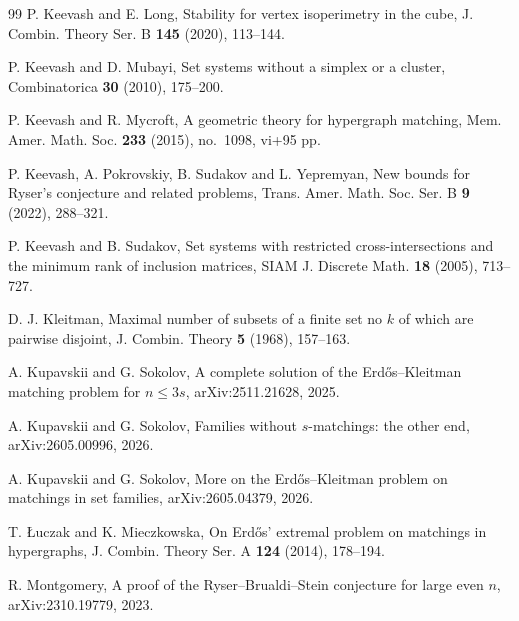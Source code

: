 \documentclass[10pt,a4paper]{article}
\numberwithin{equation}{section}
\theoremstyle{definition}
\begin{document}
\begin{thebibliography}{99}
        P. Keevash and E. Long,
        Stability for vertex isoperimetry in the cube,
        J. Combin. Theory Ser. B \textbf{145} (2020), 113--144.

        P. Keevash and D. Mubayi,
        Set systems without a simplex or a cluster,
        Combinatorica \textbf{30} (2010), 175--200.

        P. Keevash and R. Mycroft,
        A geometric theory for hypergraph matching,
        Mem. Amer. Math. Soc. \textbf{233} (2015), no.~1098, vi+95 pp.

        P. Keevash, A. Pokrovskiy, B. Sudakov and L. Yepremyan,
        New bounds for Ryser's conjecture and related problems,
        Trans. Amer. Math. Soc. Ser. B \textbf{9} (2022), 288--321.

        P. Keevash and B. Sudakov,
        Set systems with restricted cross-intersections and the minimum rank of inclusion matrices,
        SIAM J. Discrete Math. \textbf{18} (2005), 713--727.

        D. J. Kleitman,
        Maximal number of subsets of a finite set no $k$ of which are pairwise disjoint,
        J. Combin. Theory \textbf{5} (1968), 157--163.

        A. Kupavskii and G. Sokolov,
        A complete solution of the Erd\H{o}s--Kleitman matching problem for $n\le 3s$,
        arXiv:2511.21628, 2025.

        A. Kupavskii and G. Sokolov,
        Families without $s$-matchings: the other end,
        arXiv:2605.00996, 2026.

        A. Kupavskii and G. Sokolov,
        More on the Erd\H{o}s--Kleitman problem on matchings in set families,
        arXiv:2605.04379, 2026.

        T. \L{}uczak and K. Mieczkowska,
        On Erd\H{o}s' extremal problem on matchings in hypergraphs,
        J. Combin. Theory Ser. A \textbf{124} (2014), 178--194.

        R. Montgomery,
        A proof of the Ryser--Brualdi--Stein conjecture for large even $n$,
        arXiv:2310.19779, 2023.


\end{thebibliography}
\end{document}
